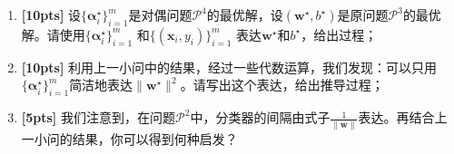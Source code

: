 \documentclass[a4paper,UTF8]{article}
\theoremstyle{definition}
\begin{document}
\begin{enumerate}[(1)]
\item \textbf{[10pts]} 设$\{\bm{\alpha}^\star_i\}_{i=1}^{m}$是对偶问题$\mathcal{P}^{4}$的最优解，设$(\mathbf{w}^\star,b^\star)$是原问题$\mathcal{P}^{3}$的最优解。请使用$\{\bm{\alpha}^\star_i\}_{i=1}^{m}$ 和$\{(\mathbf{x}_i,y_i)\}_{i=1}^{m}$ 表达$\mathbf{w}^\star$和$b^\star$，给出过程；
\item \textbf{[10pts]} 利用上一小问中的结果，经过一些代数运算，我们发现：可以只用$\{\bm{\alpha}^\star_i\}_{i=1}^{m}$简洁地表达$\|\mathbf{w}^\star\|^2$。请写出这个表达，给出推导过程；
\item \textbf{[5pts]} 我们注意到，在问题$\mathcal{P}^{2}$中，分类器的间隔由式子$\frac{1}{\|\mathbf{w}\|}$表达。再结合上一小问的结果，你可以得到何种启发？

\end{enumerate}
\end{document}
